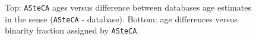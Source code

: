 \documentclass{aa}
\begin{document}
  \begin{figure}
   \caption{Top: \texttt{ASteCA} ages versus difference between databases age
   estimates in the sense (\texttt{ASteCA} - database).
   Bottom: age differences versus binarity fraction assigned by
   \texttt{ASteCA}.}
   \label{fig:ages}
  \end{figure}
\end{document}
